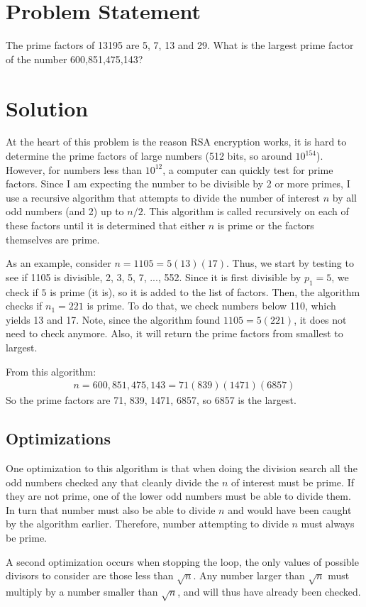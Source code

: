 \documentclass{article}
\begin{document}
\section*{Problem Statement}
The prime factors of 13195 are 5, 7, 13 and 29. What is the largest prime factor of the number 600,851,475,143?
\section*{Solution}
At the heart of this problem is the reason RSA encryption works, it is hard to determine the prime factors of large numbers (512 bits, so around $10^154$). However, for numbers less than $10^{12}$, a computer can quickly test for prime factors. Since I am expecting the number to be divisible by 2 or more primes, I use a recursive algorithm that attempts to divide the number of interest $n$ by all odd numbers (and 2) up to $n/2$. This algorithm is called recursively on each of these factors until it is determined that either $n$ is prime or the factors themselves are prime.

As an example, consider $n = 1105 = 5(13)(17)$. Thus, we start by testing to see if 1105 is divisible, 2, 3, 5, 7, ..., 552. Since it is first divisible by $p_{1} = 5$, we check if $5$ is prime (it is), so it is added to the list of factors. Then, the algorithm checks if $n_{1} = 221$ is prime. To do that, we check numbers below 110, which yields 13 and 17. Note, since the algorithm found $1105 = 5(221)$, it does not need to check anymore. Also, it will return the prime factors from smallest to largest.

From this algorithm:
\begin{gather*}
	n = 600,851,475,143 = 71(839)(1471)(6857)
\end{gather*}
So the prime factors are 71, 839, 1471, 6857, so 6857 is the largest.
\subsection*{Optimizations}
One optimization to this algorithm is that when doing the division search all the odd numbers checked any that cleanly divide the $n$ of interest must be prime. If they are not prime, one of the lower odd numbers must be able to divide them. In turn that number must also be able to divide $n$ and would have been caught by the algorithm earlier. Therefore, number attempting to divide $n$ must always be prime.

A second optimization occurs when stopping the loop, the only values of possible divisors to consider are those less than $\sqrt{n}$. Any number larger than $\sqrt{n}$ must multiply by a number smaller than $\sqrt{n}$, and will thus have already been checked.
\end{document}
